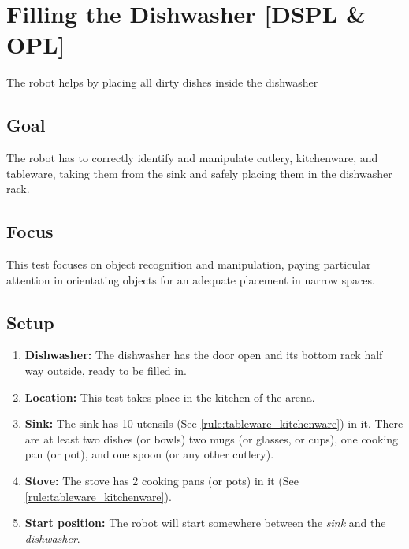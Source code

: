 \section{Filling the Dishwasher [DSPL \& OPL]}
The robot helps by placing all dirty dishes inside the dishwasher

\subsection{Goal}
The robot has to correctly identify and manipulate cutlery, kitchenware, and tableware, taking them from the sink and safely placing them in the dishwasher rack.

\subsection{Focus}
This test focuses on object recognition and manipulation, paying particular attention in orientating objects for an adequate placement in narrow spaces.

\subsection{Setup}
\begin{enumerate}
	\item \textbf{Dishwasher:} The dishwasher has the door open and its bottom rack half way outside, ready to be filled in.
	\item \textbf{Location:} This test takes place in the kitchen of the arena. 
	\item \textbf{Sink:} The sink has 10 utensils (See \ref{rule:tableware_kitchenware}) in it. There are at least two dishes (or bowls) two mugs (or glasses, or cups), one cooking pan (or pot), and one spoon (or any other cutlery).
	\item \textbf{Stove:} The stove has 2 cooking pans (or pots) in it (See \ref{rule:tableware_kitchenware}).
	\item \textbf{Start position:} The robot will start somewhere between the \textit{sink} and the \textit{dishwasher}.
\end{enumerate}


